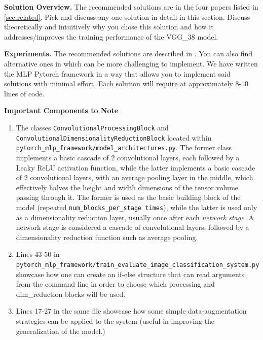 \documentclass[11pt,]{article}
\begin{document}
\textbf{Solution Overview. }The recommended solutions are in the four papers listed in \cref{sec.related}. Pick and discuss any one solution in detail in this section. Discuss theoretically and intuitively why you chose this solution and how it addresses/improves the training performance of the VGG\_38 model. 


\textbf{Experiments. } The recommended solutions are described in \cite{ioffe2015batch, he2016deep}. You can also find alternative ones in \cite{huang2017densely, lee2015deeply} which can be more challenging to implement. We have written the MLP Pytorch framework in a way that allows you to implement said solutions with minimal effort. Each solution will require at approximately 8-10 lines of code. 

\textbf{Important Components to Note}

\begin{enumerate}
    \item The classes \texttt{ConvolutionalProcessingBlock} and \texttt{ConvolutionalDimensionalityReductionBlock} located within \texttt{pytorch\_mlp\_framework/model\_architectures.py}. The former class implements a basic cascade of 2 convolutional layers, each followed by a Leaky ReLU activation function, while the latter implements a basic cascade of 2 convolutional layers, with an average pooling layer in the middle, which effectively halves the height and width dimensions of the tensor volume passing through it. The former is used as the basic building block of the model (repeated \texttt{num\_blocks\_per\_stage times}), while the latter is used only as a dimensionality reduction layer, usually once after each \emph{network stage}. A network stage is considered a cascade of convolutional layers, followed by a dimensionality reduction function such as average pooling. 
    \item Lines 43-50 in \texttt{pytorch\_mlp\_framework/train\_evaluate\_image\_classification\_system.py} showcase how one can create an if-else structure that can read arguments from the command line in order to choose which processing and dim\_reduction blocks will be used.
    \item Lines 17-27 in the same file showcase how some simple data-augmentation strategies can be applied to the system (useful in improving the generalization of the model.)
     
\end{enumerate}
\end{document}
